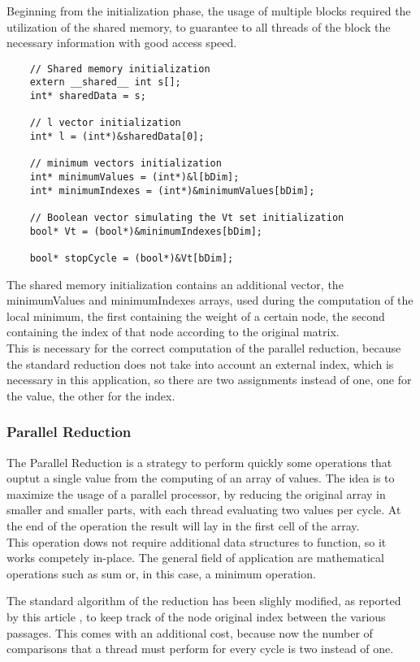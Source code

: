 \documentclass[
	a4paper, %
	12pt, %
]{class}
\begin{document}
Beginning from the initialization phase, the usage of multiple blocks required the utilization of the shared memory, to guarantee to all threads of the block
the necessary information with good access speed.
\begin{verbatim}
    // Shared memory initialization
    extern __shared__ int s[];
    int* sharedData = s;
    
    // l vector initialization
    int* l = (int*)&sharedData[0];
    
    // minimum vectors initialization
    int* minimumValues = (int*)&l[bDim];
    int* minimumIndexes = (int*)&minimumValues[bDim];
    
    // Boolean vector simulating the Vt set initialization
    bool* Vt = (bool*)&minimumIndexes[bDim];
    
    bool* stopCycle = (bool*)&Vt[bDim];
\end{verbatim}

The shared memory initialization contains an additional vector, the minimumValues and minimumIndexes arrays, used during the computation of the local minimum,
the first containing the weight of a certain node, the second containing the index of that node according to the original matrix.\\

This is necessary for the correct computation of the parallel reduction, because the standard reduction does not take into account an external index, which is necessary
in this application, so there are two assignments instead of one, one for the value, the other for the index.

\subsubsection{Parallel Reduction}
The Parallel Reduction is a strategy to perform quickly some operations that ouptut a single value from the computing of an array of values.
The idea is to maximize the usage of a parallel processor, by reducing the original array in smaller and smaller parts, with each thread evaluating two values per cycle.
At the end of the operation the result will lay in the first cell of the array.\\

This operation dows not require additional data structures to function, so it works competely in-place. The general field of application are mathematical operations such as sum or, in this case, a
minimum operation.

The standard algorithm of the reduction has been slighly modified, as reported by this article \cite{wiki}, to keep track of the node original index between the various passages. This comes with an additional
cost, because now the number of comparisons that a thread must perform for every cycle is two instead of one.
\end{document}
